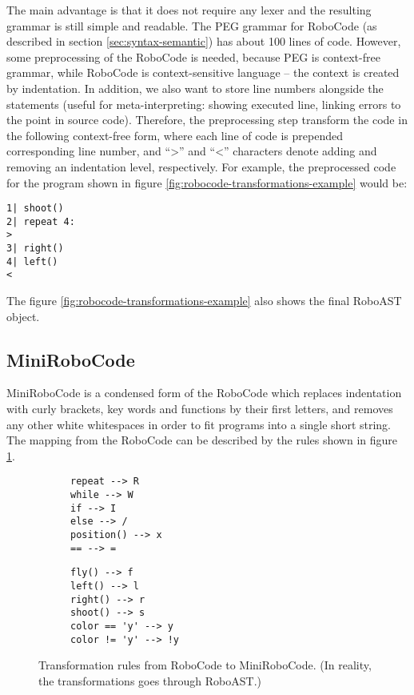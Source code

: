 The main advantage is that it does not require any lexer and the resulting grammar
is still simple and readable.
The PEG grammar for RoboCode (as described in section \ref{sec:syntax-semantic})
has about 100 lines of code.
However, some preprocessing of the RoboCode is needed, because
PEG is context-free grammar,
while RoboCode is context-sensitive language
-- the context is created by indentation.
In addition, we also want to store line numbers alongside the statements
(useful for meta-interpreting:
showing executed line,
linking errors to the point in source code).
Therefore, the preprocessing step transform the code in the following context-free form,
where each line of code is prepended corresponding line number,
and ``>'' and ``<'' characters denote adding and removing an indentation level, respectively.
For example, the preprocessed code for the program shown in figure
\ref{fig:robocode-transformations-example} would be:

\begin{lstlisting}
1| shoot()
2| repeat 4:
>
3| right()
4| left()
<
\end{lstlisting}

The figure \ref{fig:robocode-transformations-example} also shows the final RoboAST object.

\subsection{MiniRoboCode}

MiniRoboCode is a condensed form of the RoboCode
which replaces indentation with curly brackets,
key words and functions by their first letters,
and removes any other white whitespaces
in order to fit programs into a single short string.
The mapping from the RoboCode can be described by the rules
shown in figure \ref{fig:minirobocode-transformation-rules}.

\begin{figure}[h]
\begin{subfigure}{.49\textwidth}
{\lstset{numbers=none}
\begin{lstlisting}
repeat --> R
while --> W
if --> I
else --> /
position() --> x
== --> =
\end{lstlisting}}
\end{subfigure}
\begin{subfigure}{.49\textwidth}
{\lstset{numbers=none}
\begin{lstlisting}
fly() --> f
left() --> l
right() --> r
shoot() --> s
color == 'y' --> y
color != 'y' --> !y
\end{lstlisting}}
\end{subfigure}
\caption{Transformation rules from RoboCode to MiniRoboCode. (In reality, the transformations goes through RoboAST.)}
\label{fig:minirobocode-transformation-rules}
\end{figure}


